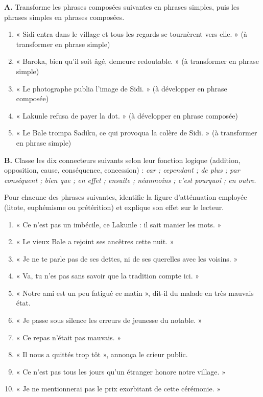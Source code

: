 \documentclass[11pt]{article}
\begin{document}
\begin{exercice}
\textbf{A.} Transforme les phrases composées suivantes en phrases simples, puis les phrases simples en phrases composées.
\begin{enumerate}
\item « Sidi entra dans le village et tous les regards se tournèrent vers elle. » (à transformer en phrase simple)
\item « Baroka, bien qu'il soit âgé, demeure redoutable. » (à transformer en phrase simple)
\item « Le photographe publia l'image de Sidi. » (à développer en phrase composée)
\item « Lakunle refusa de payer la dot. » (à développer en phrase composée)
\item « Le Bale trompa Sadiku, ce qui provoqua la colère de Sidi. » (à transformer en phrase simple)
\end{enumerate}
\textbf{B.} Classe les dix connecteurs suivants selon leur fonction logique (addition, opposition, cause, conséquence, concession) : \emph{car ; cependant ; de plus ; par conséquent ; bien que ; en effet ; ensuite ; néanmoins ; c'est pourquoi ; en outre}.
\end{exercice}

\begin{exercice}
Pour chacune des phrases suivantes, identifie la figure d'atténuation employée (litote, euphémisme ou prétérition) et explique son effet sur le lecteur.
\begin{enumerate}
\item « Ce n'est pas un imbécile, ce Lakunle : il sait manier les mots. »
\item « Le vieux Bale a rejoint ses ancêtres cette nuit. »
\item « Je ne te parle pas de ses dettes, ni de ses querelles avec les voisins. »
\item « Va, tu n'es pas sans savoir que la tradition compte ici. »
\item « Notre ami est un peu fatigué ce matin », dit-il du malade en très mauvais état.
\item « Je passe sous silence les erreurs de jeunesse du notable. »
\item « Ce repas n'était pas mauvais. »
\item « Il nous a quittés trop tôt », annonça le crieur public.
\item « Ce n'est pas tous les jours qu'un étranger honore notre village. »
\item « Je ne mentionnerai pas le prix exorbitant de cette cérémonie. »
\end{enumerate}
\end{exercice}
\end{document}
